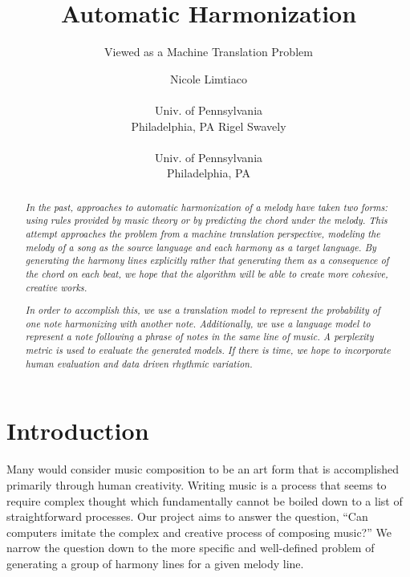 \documentclass{sig-alternate}
\begin{document}
 

\title{Automatic Harmonization}
\subtitle{Viewed as a Machine Translation Problem}
\author{
\alignauthor Nicole Limtiaco \\  \\ Univ. of Pennsylvania \\ Philadelphia, PA
\alignauthor Rigel Swavely \\  \\ Univ. of Pennsylvania \\ Philadelphia, PA}
\date{}
\maketitle

\begin{abstract}
  \textit{In the past, approaches to automatic harmonization of a melody
  have taken two forms: using rules provided by music theory or by predicting
  the chord under the melody. This attempt approaches the problem from a machine translation perspective, 
  modeling the melody of a song as the source language and each harmony as a target language.
  By generating the harmony lines explicitly rather that generating them as a
  consequence of the chord on each beat, we hope that the algorithm will be able to create
  more cohesive, creative works.}

  \textit{In order to accomplish this, we use a translation model to represent the probability
  of one note harmonizing with another note. Additionally, we use a language model to represent
  a note following a phrase of notes in the same line of music. A perplexity metric is used to 
  evaluate the generated models. If there is time, we hope to incorporate human evaluation
  and data driven rhythmic variation.}
\end{abstract}

\section{Introduction}
\label{sec:intro}
Many would consider music composition to be an art form that is accomplished
primarily through human creativity. Writing music is a process that seems to require
complex thought which fundamentally cannot be boiled down to a list of straightforward
processes. Our project aims to answer the question, ``Can computers imitate the complex
and creative process of composing music?'' We narrow the question down to the more specific
and well-defined problem of generating a group of harmony lines for a given melody line.
\end{document}
